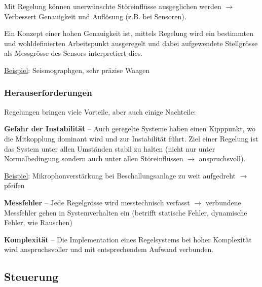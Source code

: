 \documentclass[
  10pt,
  a4paper,
]{article}
\numberwithin{equation}{section}
\begin{document}
\begin{multicols}{2}
Mit Regelung können unerwünschte Störeinflüsse ausgeglichen werden
\(\rightarrow\) Verbessert Genauigkeit und Auflösung (z.B. bei
Sensoren).

\begin{tcolorbox}[enhanced jigsaw, coltitle=black, arc=.35mm, breakable, opacityback=0, opacitybacktitle=0.6, rightrule=.15mm, titlerule=0mm, bottomrule=.15mm, leftrule=.75mm, bottomtitle=1mm, colframe=quarto-callout-note-color-frame, toprule=.15mm, colbacktitle=quarto-callout-note-color!10!white, toptitle=1mm, title=\textcolor{quarto-callout-note-color}{\faInfo}\hspace{0.5em}{Anwendungen}, left=2mm, colback=white]

Ein Konzept einer hohen Genauigkeit ist, mittels Regelung wird ein
bestimmten und wohldefinierten Arbeitspunkt ausgeregelt und dabei
aufgewendete Stellgrösse als Messgrösse des Sensors interpretiert dies.

\ul{Beispiel}: Seismographgen, sehr präzise Waagen

\end{tcolorbox}

\hypertarget{herauserforderungen}{%
\subsubsection{Herauserforderungen}\label{herauserforderungen}}

Regelungen bringen viele Vorteile, aber auch einige Nachteile:

\textbf{Gefahr der Instabilität} -- Auch geregelte Systeme haben einen
Kipppunkt, wo die Mitkopplung dominant wird und zur Instabilität führt.
Ziel einer Regelung ist das System unter allen Umständen stabil zu
halten (nicht nur unter Normalbedingung sondern auch unter allen
Störeinflüssen \(\rightarrow\) anspruchsvoll).

\ul{Beispiel}: Mikrophonverstärkung bei Beschallungsanlage zu weit
aufgedreht \(\rightarrow\) pfeifen

\textbf{Messfehler} -- Jede Regelgrösse wird messtechnisch verfasst
\(\rightarrow\) verbundene Messfehler gehen in Systemverhalten ein
(betrifft statische Fehler, dynamische Fehler, wie Rauschen)

\textbf{Komplexität} -- Die Implementation eines Regelsystems bei hoher
Komplexität wird anspruchsvoller und mit entsprechendem Aufwand
verbunden.

\hypertarget{steuerung}{%
\subsection{Steuerung}\label{steuerung}}


\end{multicols}
\end{document}
